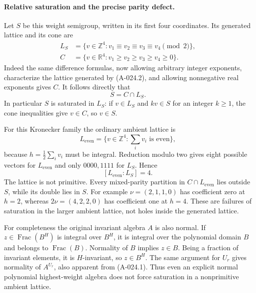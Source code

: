 \paragraph{Relative saturation and the precise parity defect.}
Let $S$ be this weight semigroup, written in its first four
coordinates. Its generated lattice and its cone are
\[
 \begin{split}
 L_S&=\{v\in\mathbb Z^4:v_1\equiv v_2\equiv v_3\equiv v_4
                                                       \pmod2\},\\
 C&=\{v\in\mathbb R^4:v_1\geq v_2\geq v_3\geq v_4\geq0\}.
 \end{split}
\]
Indeed the same difference formulas, now allowing arbitrary
integer exponents, characterize the lattice generated by
(A-024.2), and allowing nonnegative real exponents gives $C$.
It follows directly that
\[
                         S=C\cap L_S.                 \tag{A-024.5}
\]
In particular $S$ is saturated in $L_S$: if $v\in L_S$
and $kv\in S$ for an integer $k\geq1$, the cone inequalities
give $v\in C$, so $v\in S$.

For this Kronecker family the ordinary ambient lattice is
\[
                L_{\mathrm{even}}=
                    \{v\in\mathbb Z^4:\textstyle\sum_i v_i
                                                        \text{ is even}\},
\]
because $h=\frac12\sum_i v_i$ must be integral. Reduction
modulo two gives eight possible vectors for $L_{\mathrm{even}}$
and only $0000,1111$ for $L_S$. Hence
\[
                         [L_{\mathrm{even}}:L_S]=4.    \tag{A-024.6}
\]
The lattice is not primitive. Every mixed-parity partition in
$C\cap L_{\mathrm{even}}$ lies outside $S$, while its double
lies in $S$. For example $\nu=(2,1,1,0)$ has coefficient
zero at $h=2$, whereas $2\nu=(4,2,2,0)$ has coefficient
one at $h=4$. These are failures of saturation in the larger
ambient lattice, not holes inside the generated lattice.

For completeness the original invariant algebra $A$ is also
normal. If $z\in\operatorname{Frac}(B^H)$ is integral over
$B^H$, it is integral over the polynomial domain $B$ and
belongs to $\operatorname{Frac}(B)$. Normality of $B$ implies
$z\in B$. Being a fraction of invariant elements, it is
$H$-invariant, so $z\in B^H$. The same argument for $U_r$
gives normality of $A^{U_r}$, also apparent from (A-024.1).
Thus even an explicit normal polynomial highest-weight algebra
does not force saturation in a nonprimitive ambient lattice.

